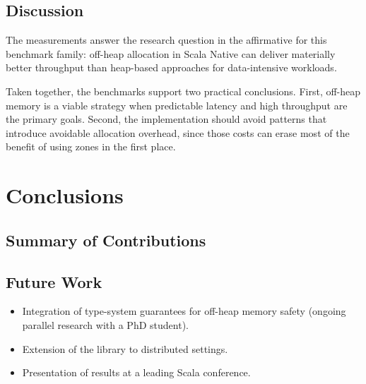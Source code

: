 \documentclass[
  english,   %
  bibtex,    %
]{kththesis}
\begin{document}
\section{Discussion}

The measurements answer the research question in the affirmative for this
benchmark family: off-heap allocation in Scala Native can deliver materially
better throughput than heap-based approaches for data-intensive workloads.

Taken together, the benchmarks support two practical conclusions. First,
off-heap memory is a viable strategy when predictable latency and high
throughput are the primary goals. Second, the implementation should avoid
patterns that introduce avoidable allocation overhead, since those costs can
erase most of the benefit of using zones in the first place.

\chapter{Conclusions}
\label{ch:conclusions}

\section{Summary of Contributions}


\section{Future Work}
\label{sec:future_work}

\begin{itemize}
  \item Integration of type-system guarantees for off-heap memory safety
        (ongoing parallel research with a PhD student).
  \item Extension of the library to distributed settings.
  \item Presentation of results at a leading Scala conference.
\end{itemize}

\iftoggle{biblatex}{
  \printbibliography
}{
  
}
\end{document}
